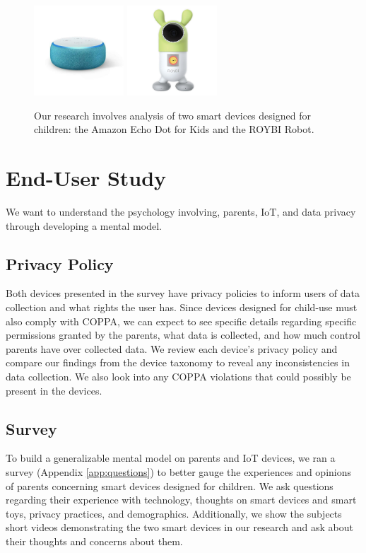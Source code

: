 \documentclass[12pt]{ucthesis}
\begin{document}
\begin{figure}
    \centering
    \includegraphics[width=0.3\textwidth]{echo.jpg}
    \includegraphics[width=0.3\textwidth]{ROYBI.jpg}
    \caption{Our research involves analysis of two smart devices designed for children: the Amazon Echo Dot for Kids and the ROYBI Robot.}
    \label{fig:devices}
\end{figure}

\section{End-User Study}
We want to understand the psychology involving, parents, IoT, and data privacy through developing a mental model.

\subsection{Privacy Policy}
Both devices presented in the survey have privacy policies to inform users of data collection and what rights the user has. Since devices designed for child-use must also comply with COPPA, we can expect to see specific details regarding specific permissions granted by the parents, what data is collected, and how much control parents have over collected data. We review each device's privacy policy and compare our findings from the device taxonomy to reveal any inconsistencies in data collection. We also look into any COPPA violations that could possibly be present in the devices.

\subsection{Survey}
To build a generalizable mental model on parents and IoT devices, we ran a survey (Appendix \ref{app:questions}) to better gauge the experiences and opinions of parents concerning smart devices designed for children. We ask questions regarding their experience with technology, thoughts on smart devices and smart toys, privacy practices, and demographics. Additionally, we show the subjects short videos demonstrating the two smart devices in our research and ask about their thoughts and concerns about them. 
\end{document}
